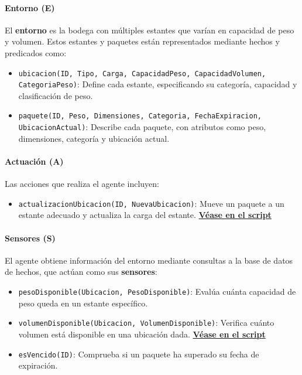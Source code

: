 \documentclass[12pt]{article}
\begin{document}
\paragraph{Entorno (E)}
El \textbf{entorno} es la bodega con múltiples estantes que varían en capacidad de peso y volumen. Estos estantes y paquetes están representados mediante hechos y predicados como:
\begin{itemize}
    \item \texttt{ubicacion(ID, Tipo, Carga, CapacidadPeso, CapacidadVolumen, CategoriaPeso)}: Define cada estante, especificando su categoría, capacidad y clasificación de peso.
    \item \texttt{paquete(ID, Peso, Dimensiones, Categoria, FechaExpiracion, UbicacionActual)}: Describe cada paquete, con atributos como peso, dimensiones, categoría y ubicación actual.
\end{itemize}

\paragraph{Actuación (A)}
Las acciones que realiza el agente incluyen:
\begin{itemize}
    \item \texttt{actualizacionUbicacion(ID, NuevaUbicacion)}: Mueve un paquete a un estante adecuado y actualiza la carga del estante.
    \hyperref[Véase en el script}}
    \item \texttt{manejarVencimiento(ID)}: Identifica paquetes vencidos y los traslada a la zona de mermas.
    
    \item \texttt{asignarPaquetes}: Itera sobre todos los paquetes sin ubicar para asignarles una ubicación en la bodega.
    \hyperref[lst:asignarPaquetes]{ \textbf{Véase en el script}}
\end{itemize}

\paragraph{Sensores (S)}
El agente obtiene información del entorno mediante consultas a la base de datos de hechos, que actúan como sus \textbf{sensores}:
\begin{itemize}
    \item \texttt{pesoDisponible(Ubicacion, PesoDisponible)}: Evalúa cuánta capacidad de peso queda en un estante específico.
    \item \texttt{volumenDisponible(Ubicacion, VolumenDisponible)}: Verifica cuánto volumen está disponible en una ubicación dada.
    \hyperref[lst:volumenDisponible]{ \textbf{Véase en el script}}
    \item \texttt{esVencido(ID)}: Comprueba si un paquete ha superado su fecha de expiración.
\end{itemize}
\end{document}
